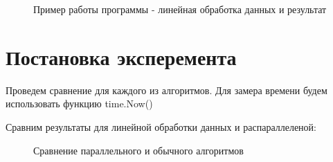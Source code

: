 \documentclass[12pt]{report}
\begin{document}
\begin{figure}[H]
	\caption{Пример работы программы - линейная обработка данных и результат}
	\label{ris:example_lin}
\end{figure}

\section{Постановка эксперемента}
Проведем сравнение для каждого из алгоритмов. Для замера времени будем использовать функцию time.Now()

Сравним результаты для линейной обработки данных и распараллеленой:
\newpage

\begin{figure}
\caption{Сравнение параллельного и обычного алгоритмов} \label{plot:even}
\end{figure}
\par
\end{document}
